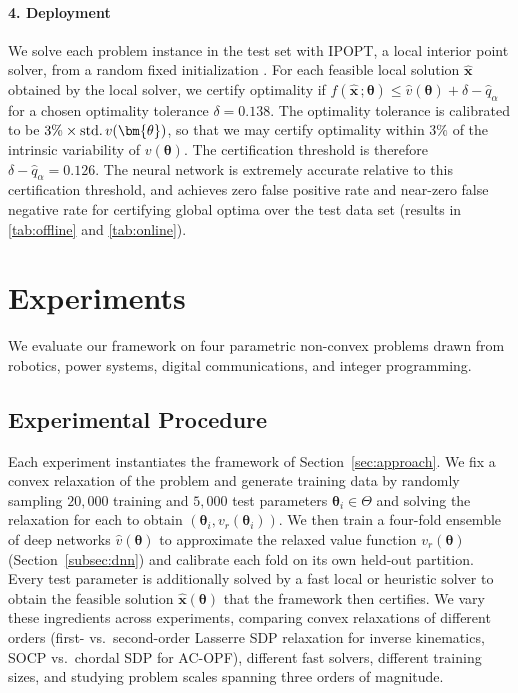 \documentclass[10pt]{article} %
\theoremstyle{plain}
\theoremstyle{definition}
\theoremstyle{remark}
\begin{document}
\paragraph{4. Deployment} We solve each problem instance in the test set with IPOPT, a local interior point solver, from a random fixed initialization \citep{wachter2006implementation}. For each feasible local solution $\hat{\mathbf{x}}$ obtained by the local solver, we certify optimality if $f(\hat{\mathbf{x}}\,;\bm{\theta}) \leq \hat{v}(\bm{\theta}) + \delta - \hat{q}_\alpha$ for a chosen optimality tolerance $\delta = 0.138$. The optimality tolerance is calibrated to be $3 \% \times \text{std.\,} v(\bm{\theta})$, so that we may certify optimality within $3\%$ of the intrinsic variability of $v(\bm{\theta})$. The certification threshold is therefore $\delta - \hat{q}_\alpha = 0.126$. The neural network is extremely accurate relative to this certification threshold, and achieves zero false positive rate and near-zero false negative rate for certifying global optima over the test data set (results in \cref{tab:offline}{}{} and \cref{tab:online}{}{}).

\section{Experiments} \label{sec:experiments}

We evaluate our framework on four parametric non-convex problems drawn from robotics, power systems, digital communications, and integer programming.

\subsection*{Experimental Procedure}

Each experiment instantiates the framework of Section~\ref{sec:approach}. We fix a convex relaxation of the problem and generate training data by randomly sampling 
$20{,}000$ training and $5{,}000$ test parameters $\bm{\theta}_i \in \Theta$ and solving the relaxation for each to obtain $(\bm{\theta}_i, v_r(\bm{\theta}_i))$. 
We then train a four-fold ensemble of deep networks $\hat{v}(\bm{\theta})$ to approximate the relaxed value function $v_r(\bm{\theta})$ (Section~\ref{subsec:dnn}) and calibrate each fold on its own held-out partition. Every test parameter is additionally solved by a fast local or heuristic solver to obtain the feasible solution $\hat{\mathbf{x}}(\bm{\theta})$ that the framework then certifies. We vary these ingredients across experiments, comparing convex relaxations of different orders (first- vs.\ second-order Lasserre SDP relaxation for inverse kinematics, SOCP vs.\ chordal SDP for AC-OPF), different fast solvers, different training sizes, and studying problem scales spanning three orders of magnitude.
\end{document}
